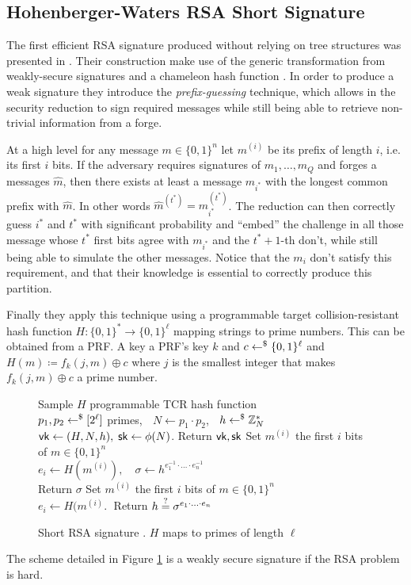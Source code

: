 
\subsection{Hohenberger-Waters RSA Short Signature}
The first efficient RSA signature produced without relying on tree structures was presented in \cite{C:HohWat09}. Their construction make use of the generic transformation from weakly-secure signatures and a chameleon hash function .
In order to produce a weak signature they introduce the \textit{prefix-guessing} technique, which allows in the security reduction to sign required messages while still being able to retrieve non-trivial information from a forge.

At a high level for any message $m \in \{0, 1\}^n$ let $m^{(i)}$ be its prefix of length $i$, i.e. its first $i$ bits. 
If the adversary requires signatures of $m_1, \ldots, m_Q$ and forges a messages $\hat{m}$, then there exists at least a message $m_{i^\ast}$ with the longest common prefix with $\hat{m}$.
In other words $\hat{m}^{(t^\ast)} = m_{i^\ast}^{(t^\ast)}$.
The reduction can then correctly guess $i^\ast$ and $t^\ast$ with significant probability and ``embed'' the challenge in all those message whose $t^\ast$ first bits agree with $m_{i^\ast}$ and the $t^\ast + 1$-th don't, while still being able to simulate the other messages.
Notice that the $m_i$ don't satisfy this requirement, and that their knowledge is essential to correctly produce this partition.

Finally they apply this technique using a programmable target collision-resistant hash function $H : \{0, 1\}^\ast \to \{0, 1\}^\ell$ mapping strings to prime numbers.
This can be obtained from a PRF. 
A key a PRF's key $k$ and $c \gets^{\$} \{0, 1\}^\ell$ and $H(m) \coloneqq f_k(j, m) \oplus c$ where $j$ is the smallest integer that makes $f_k(j, m) \oplus c$ a prime number.

\begin{figure}[htb]
\centering
\begin{pcvstack}
		{
			Sample $H$ programmable TCR hash function
				\\
			$p_1, p_2 \gets^{\$} {[2^\ell]}$ primes, $\;$ $N \gets p_1 \cdot p_2$, $\;$ $h \gets^{\$} \mathbb{Z}_N^\ast$
				\\
			$\vk \gets (H, N, h), \; \sk \gets \phi(N)$. Return $\vk, \sk$
		}
		{
			Set $m^{(i)}$ the first $i$ bits of $m \in \{0, 1\}^n$
				\\
			$e_i \gets H(m^{(i)}), \quad \sigma \gets h^{e_1^{-1} \cdot \ldots \cdot e_n^{-1}}$
				\\
			Return $\sigma$
		}
		{
			Set $m^{(i)}$ the first $i$ bits of $m \in \{0, 1\}^n$
				\\
			$e_i \gets H(m^{(i)}. \;$ Return $h \stackrel{?}{=} \sigma^{e_1 \cdot \ldots \cdot e_n}$
		}
\end{pcvstack}
\label{prot:HohWat09}
\caption{Short RSA signature \cite{C:HohWat09}. $H$ maps to primes of length $\ell$}
\end{figure}

\begin{proposition}
	\label{prop:HohWat09}
	The scheme detailed in Figure \ref{prot:HohWat09} is a weakly secure signature if the RSA problem is hard.
\end{proposition}
